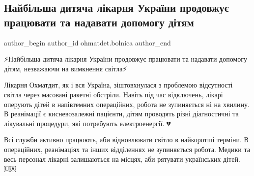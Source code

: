  
 
 
 
 
 
\subsection{Найбільша дитяча лікарня України продовжує працювати та надавати допомогу дітям}
\label{sec:24_11_2022.fb.ohmatdet.bolnica.1.pracja}
 
\ifcmt
 author_begin
   author_id ohmatdet.bolnica
 author_end
\fi

⚡️Найбільша дитяча лікарня України продовжує працювати та надавати допомогу дітям, незважаючи на вимкнення світла⚡️

Лікарня Охматдит, як і вся Україна, зіштовхнулася з проблемою відсутності
світла через масовані ракетні обстріли. Навіть під час відключень, лікарі
оперують дітей в напівтемних операційних, робота не зупиняється ні на хвилину.
В реанімації є кисневозалежні пацієнти, дітям проводять різні діагностичні та
лікувальні процедури, які потребують електроенергії. 💔

Всі служби активно працюють, аби відновлювати світло в найкоротші терміни. В
операційних, реанімаціях та інших відділеннях не зупиняється робота. Медики та
весь персонал лікарні залишаються на місцях, аби рятувати українських
дітей.🇺🇦
